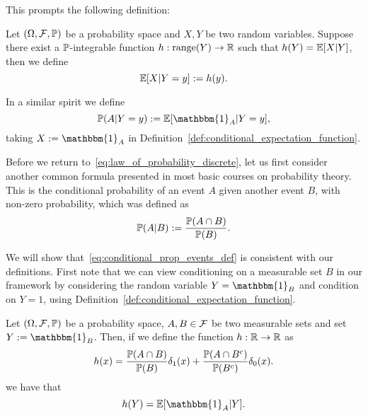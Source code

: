 This prompts the following definition:

\begin{definition}\label{def:conditional_expectation_function}
Let $(\Omega, \mathcal F, \mathbb P)$ be a probability space and $X, Y$ be two random variables. Suppose there exist a $\mathbb P$-integrable function $h : \mathrm{range}(Y) \to \mathbb R$ such that $h(Y) = \mathbb E[X | Y]$, then we define
\[
	\mathbb E[X | Y = y] := h(y).
\]
\end{definition}

In a similar spirit we define
\[
	\bbP(A | Y = y) := \bbE[\mathbbm{1}_A | Y = y],
\]
taking $X := \mathbbm{1}_A$ in Definition~\ref{def:conditional_expectation_function}.

Before we return to~\eqref{eq:law_of_probability_discrete}, let us first consider another common formula presented in most basic courses on probability theory. This is the conditional probability of an event $A$ given another event $B$, with non-zero probability, which was defined as
\begin{equation}\label{eq:conditional_prop_events_def}
	\mathbb P(A|B) := \frac{\mathbb P(A \cap B)}{\mathbb P(B)}.
\end{equation}

We will show that~\eqref{eq:conditional_prop_events_def} is consistent with our definitions. First note that we can view conditioning on a measurable set $B$ in our framework by considering the random variable $Y = \mathbbm{1}_B$ and condition on $Y = 1$, using Definition~\ref{def:conditional_expectation_function}.

\begin{lemma}\label{lem:conditional_expectation_function}
Let $(\Omega, \mathcal F, \mathbb P)$ be a probability space, $A, B \in \mathcal F$ be two measurable sets and set $Y := \mathbbm{1}_B$. Then, if we define the function $h : \mathbb R \to \mathbb R$ as
\[
	h(x) = \frac{\mathbb P(A \cap B)}{\mathbb P(B)} \delta_{1}(x) + \frac{\mathbb P(A \cap B^c)}{\mathbb P(B^c)}\delta_{0}(x).
\]
we have that
\[
	h(Y) = \bbE[\mathbbm{1}_A | Y].
\]
\end{lemma}

